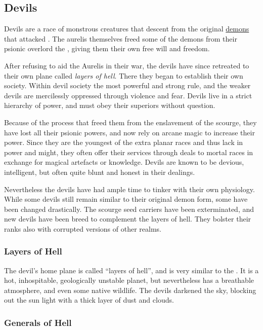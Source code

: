 \subsection{Devils}
\label{sec:Devils}

Devils are a race of monstrous creatures that descent from the original
\hyperref[sec:Demons]{demons} that attacked . The aurelis
themselves freed some of the demons from their psionic overlord the
, giving them their own free will and freedom.

After refusing to aid the Aurelis in their war, the devils have since
retreated to their own plane called \emph{layers of hell}. There they began to
establish their own society. Within devil society the most powerful and strong
rule, and the weaker devils are mercilessly oppressed through violence and
fear. Devils live in a strict hierarchy of power, and must obey their
superiors without question.

Because of the process that freed them from the enslavement of the scourge,
they have lost all their psionic powers, and now rely on arcane magic to
increase their power. Since they are the youngest of the extra planar races
and thus lack in power and might, they often offer their services through
deals to mortal races in exchange for magical artefacts or knowledge. Devils
are known to be devious, intelligent, but often quite blunt and honest in
their dealings.

Nevertheless the devils have had ample time to tinker with their own
physiology. While some devils still remain similar to their original demon
form, some have been changed drastically. The scourge seed carriers have been
exterminated, and new devils have been breed to complement the layers of hell.
They bolster their ranks also with corrupted versions of other realms.

\subsubsection{Layers of Hell}
\label{sec:Layers of Hell}

The devil's home plane is called ``layers of hell'', and is very similar to
the . It is a hot, inhospitable, geologically unstable
planet, but nevertheless has a breathable atmosphere, and even some native
wildlife. The devils darkened the sky, blocking out the sun light with a thick
layer of dust and clouds.

\subsubsection{Generals of Hell}

